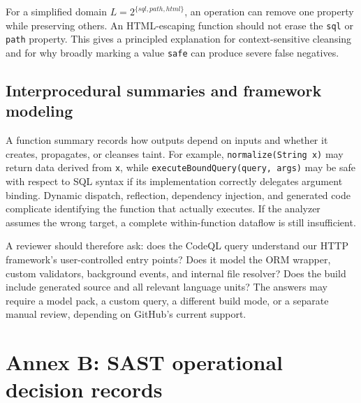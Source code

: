 \documentclass[
  letterpaper,
]{article}
\begin{document}
For a simplified domain \(L=2^{\{sql,path,html\}}\), an operation can
remove one property while preserving others. An HTML-escaping function
should not erase the \texttt{sql} or \texttt{path} property. This gives
a principled explanation for context-sensitive cleansing and for why
broadly marking a value \texttt{safe} can produce severe false
negatives.

\subsection{Interprocedural summaries and framework
modeling}\label{interprocedural-summaries-and-framework-modeling}

A function summary records how outputs depend on inputs and whether it
creates, propagates, or cleanses taint. For example,
\texttt{normalize(String\ x)} may return data derived from \texttt{x},
while \texttt{executeBoundQuery(query,\ args)} may be safe with respect
to SQL syntax if its implementation correctly delegates argument
binding. Dynamic dispatch, reflection, dependency injection, and
generated code complicate identifying the function that actually
executes. If the analyzer assumes the wrong target, a complete
within-function dataflow is still insufficient.

A reviewer should therefore ask: does the CodeQL query understand our
HTTP framework's user-controlled entry points? Does it model the ORM
wrapper, custom validators, background events, and internal file
resolver? Does the build include generated source and all relevant
language units? The answers may require a model pack, a custom query, a
different build mode, or a separate manual review, depending on GitHub's
current support.

\section{Annex B: SAST operational decision
records}\label{annex-b-sast-operational-decision-records}
\end{document}
